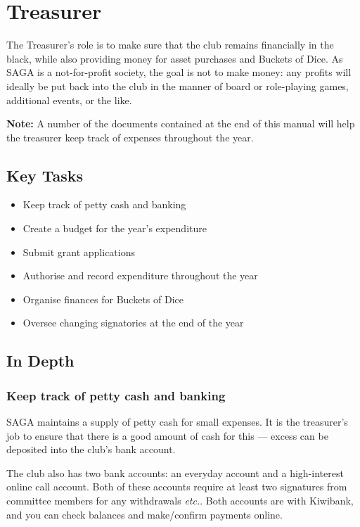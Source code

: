 \section{Treasurer}
\label{sec:treasurer}

The Treasurer's role is to make sure that the club remains financially in the black, while also providing money for asset purchases and Buckets of Dice. As SAGA is a not-for-profit society, the goal is not to make money: any profits will ideally be put back into the club in the manner of board or role-playing games, additional events, or the like.

\textbf{Note:} A number of the documents contained at the end of this manual will help the treasurer keep track of expenses throughout the year.

\subsection{Key Tasks}

\begin{itemize}
  \item Keep track of petty cash and banking
  \item Create a budget for the year's expenditure
  \item Submit grant applications
  \item Authorise and record expenditure throughout the year
  \item Organise finances for Buckets of Dice
  \item Oversee changing signatories at the end of the year
\end{itemize}

\subsection{In Depth}

\subsubsection{Keep track of petty cash and banking}

SAGA maintains a supply of petty cash for small expenses. It is the treasurer's job to ensure that there is a good amount of cash for this --- excess can be deposited into the club's bank account.

The club also has two bank accounts: an everyday account and a high-interest online call account. Both of these accounts require at least two signatures from committee members for any withdrawals \textit{etc.}. Both accounts are with Kiwibank, and you can check balances and make/confirm payments online.

